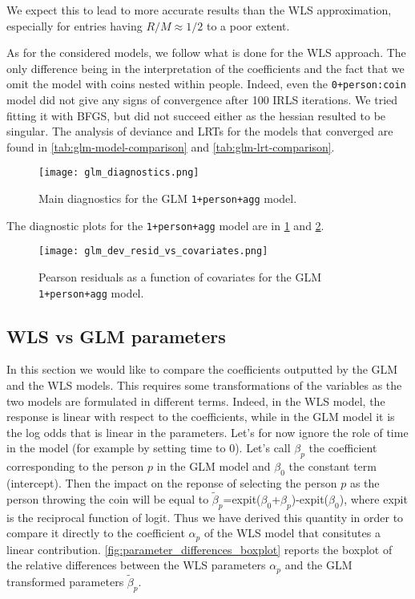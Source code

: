 \documentclass[a4paper, 12pt,oneside]{article}
\begin{document}
			We expect this to lead to more accurate results than the WLS approximation, especially for entries having $R/M\approx 1/2$ to a poor extent.

			As for the considered models, we follow what is done for the WLS approach. The only difference being in the interpretation of the coefficients and the fact that we omit the model with coins nested within people. Indeed, even the \texttt{0+person:coin} model did not give any signs of convergence after 100 IRLS iterations. We tried fitting it with BFGS, but did not succeed either as the hessian resulted to be singular. The analysis of deviance and LRTs for the models that converged are found in \ref{tab:glm-model-comparison} and \ref{tab:glm-lrt-comparison}.
			\begin{figure}[htb]
				\centering
				\texttt{[image: glm\_diagnostics.png]}
				\caption{Main diagnostics for the GLM \texttt{1+person+agg} model.}
				\label{fig:glm-diagnostic}
			\end{figure}

			The diagnostic plots for the \texttt{1+person+agg} model are in \ref{fig:glm-diagnostic} and \ref{fig:dev-resid-vs-covariates}. 
			\begin{figure}[htb]
				\vspace{-1em}
				\centering
				\texttt{[image: glm\_dev\_resid\_vs\_covariates.png]}
				\caption{Pearson residuals as a function of covariates for the GLM \texttt{1+person+agg} model.}
				\label{fig:dev-resid-vs-covariates}
			\end{figure}	
		
		\subsection{WLS vs GLM parameters}

		In this section we would like to compare the coefficients outputted by the GLM and the WLS models. This requires some transformations of the variables as the two models are formulated in different terms. Indeed, in the WLS model, the response is linear with respect to the coefficients, while in the GLM model it is the log odds that is linear in the parameters. Let's for now ignore the role of time in the model (for example by setting time to 0). Let's call $\beta_{p}$ the coefficient corresponding to the person $p$ in the GLM model and $\beta_{0}$ the constant term (intercept). Then the impact on the reponse of selecting the person $p$ as the person throwing the coin will be equal to $\tilde{\beta}_{p}$=expit($\beta_{0}$+$\beta_{p}$)-expit($\beta_{0}$), where expit is the reciprocal function of logit. Thus we have derived this quantity in order to compare it directly to the coefficient $\alpha_{p}$ of the WLS model that consitutes a linear contribution. \ref{fig:parameter_differences_boxplot} reports the boxplot of the relative differences between the WLS parameters $\alpha_{p}$ and the GLM transformed parameters $\tilde{\beta}_{p}$. 
\end{document}

